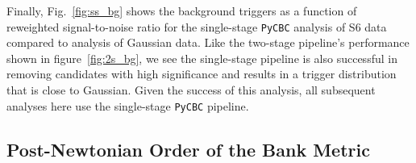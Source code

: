 \documentclass[12pt]{iopart} \usepackage{graphicx,amssymb}
\begin{document}
Finally, Fig.~\ref{fig:ss_bg} shows the background triggers as a function
of reweighted signal-to-noise ratio for the single-stage \texttt{PyCBC} 
analysis of S6 data compared to analysis
of Gaussian data. Like the two-stage pipeline's performance shown in
figure~\ref{fig:2s_bg}, we see the single-stage pipeline is also successful in
removing candidates with high significance and results in a trigger
distribution that is close to Gaussian. Given the success of this analysis,
all subsequent analyses here use the single-stage \texttt{PyCBC} pipeline.

\subsection{Post-Newtonian Order of the Bank Metric}
\label{s:banks-metric}
\end{document}
